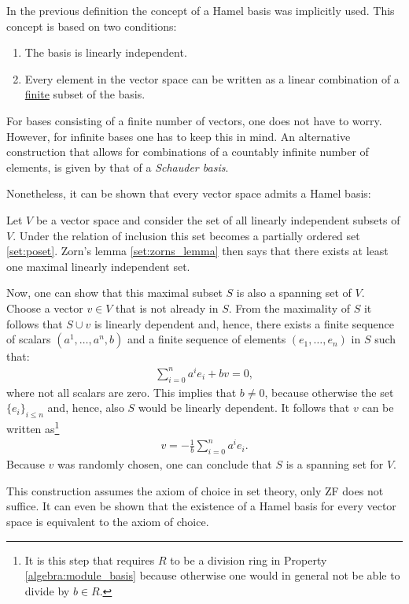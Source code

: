     \begin{remark}
        In the previous definition the concept of a Hamel basis was implicitly used. This concept is based on two conditions:
        \begin{enumerate}
            \item The basis is linearly independent.
            \item Every element in the vector space can be written as a linear combination of a \underline{finite} subset of the basis.
        \end{enumerate}
        For bases consisting of a finite number of vectors, one does not have to worry. However, for infinite bases one has to keep this in mind. An alternative construction that allows for combinations of a countably infinite number of elements, is given by that of a \textit{Schauder basis}.
    \end{remark}
    Nonetheless, it can be shown that every vector space admits a Hamel basis:
    \begin{construct}\label{linalgebra:hamel_basis}
        Let $V$ be a vector space and consider the set of all linearly independent subsets of $V$. Under the relation of inclusion this set becomes a partially ordered set \ref{set:poset}. Zorn's lemma \ref{set:zorns_lemma} then says that there exists at least one maximal linearly independent set.

        Now, one can show that this maximal subset $S$ is also a spanning set of $V$. Choose a vector $v\in V$ that is not already in $S$. From the maximality of $S$ it follows that $S\cup v$ is linearly dependent and, hence, there exists a finite sequence of scalars $(a^1,\ldots,a^n,b)$ and a finite sequence of elements $(e_1,\ldots,e_n)$ in $S$ such that:
        \begin{gather}
            \sum_{i=0}^n a^ie_i + bv = 0,
        \end{gather}
        where not all scalars are zero. This implies that $b\neq0$, because otherwise the set $\{e_i\}_{i\leq n}$ and, hence, also $S$ would be linearly dependent. It follows that $v$ can be written as\footnote{It is this step that requires $R$ to be a division ring in Property \ref{algebra:module_basis} because otherwise one would in general not be able to divide by $b\in R$.}
        \begin{gather}
            v = -\frac{1}{b}\sum_{i=0}^na^ie_i.
        \end{gather}
        Because $v$ was randomly chosen, one can conclude that $S$ is a spanning set for $V$.
    \end{construct}
    \begin{remark*}
        This construction assumes the axiom of choice in set theory, only ZF does not suffice. It can even be shown that the existence of a Hamel basis for every vector space is equivalent to the axiom of choice.
    \end{remark*}

